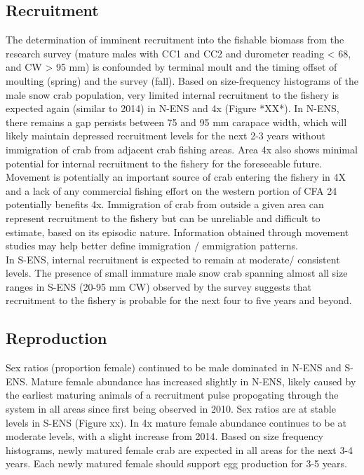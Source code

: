 \documentclass[paper=a4, fontsize=11pt]{article}
\begin{document}
\subsection{Recruitment}
The determination of imminent recruitment into the fishable biomass from the research survey (mature males with CC1 and CC2 and durometer reading < 68, and CW > 95 mm) is confounded by terminal moult and the timing offset of moulting (spring) and the survey (fall). Based on size-frequency histograms of the male snow crab population, very limited internal recruitment to the fishery is expected again (similar to 2014) in N-ENS and 4x (Figure *XX*). In N-ENS, there remains a gap persists between 75 and 95 mm carapace width, which will likely maintain depressed recruitment levels for the next 2-3 years without immigration of crab from adjacent crab fishing areas. Area 4x also shows minimal potential for internal recruitment to the fishery for the foreseeable future. Movement is potentially an important source of crab entering the fishery in 4X and a lack of any commercial fishing effort on the western portion of CFA 24 potentially benefits 4x. Immigration of crab from outside a given area can represent recruitment to the fishery but can be unreliable and difficult to estimate,  based on its episodic nature. Information obtained through movement studies may help better define immigration / emmigration patterns. \\

In S-ENS, internal recruitment is expected to remain at moderate/ consistent levels. The presence of small immature male snow crab spanning almost all size ranges in S-ENS (20-95 mm CW) observed by the survey suggests that recruitment to the fishery is probable for the next four to five years and beyond. 
\clearpage

\subsection{Reproduction}

Sex ratios (proportion female) continued to be male dominated in N-ENS and S-ENS. Mature female abundance has increased slightly in N-ENS, likely caused by the earliest maturing animals of a recruitment pulse propogating through the system in all areas since first being observed in 2010.  Sex ratios are at stable levels in S-ENS (Figure xx). In 4x mature female abundance continues to be at moderate levels, with a slight increase from 2014. Based on size frequency histograms, newly matured female crab are expected in all areas for the next 3-4 years. Each newly matured female should support egg production for 3-5 years. \\
\end{document}
